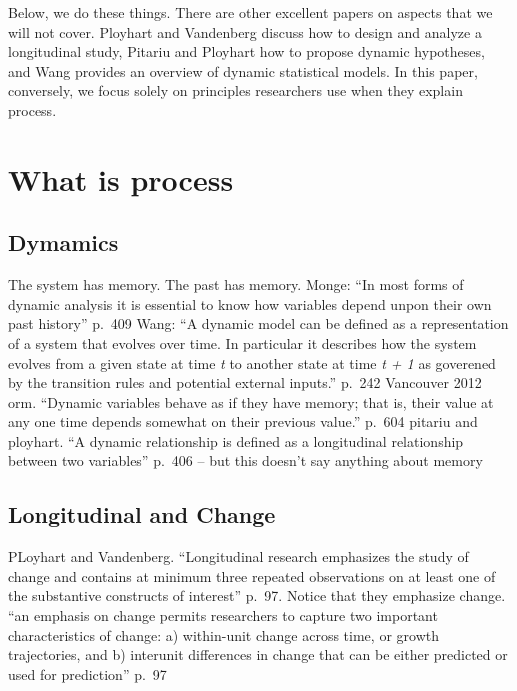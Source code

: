 \documentclass[english,,man]{apa6}
\theoremstyle{definition}
\theoremstyle{definition}
\theoremstyle{definition}
\theoremstyle{remark}
\begin{document}
Below, we do these things. There are other excellent papers on aspects
that we will not cover. Ployhart and Vandenberg discuss how to design
and analyze a longitudinal study, Pitariu and Ployhart how to propose
dynamic hypotheses, and Wang provides an overview of dynamic statistical
models. In this paper, conversely, we focus solely on principles
researchers use when they explain process.

\hypertarget{what-is-process}{%
\section{What is process}\label{what-is-process}}

\hypertarget{dymamics}{%
\subsection{Dymamics}\label{dymamics}}

The system has memory. The past has memory. Monge: \enquote{In most
forms of dynamic analysis it is essential to know how variables depend
unpon their own past history} p.~409 Wang: \enquote{A dynamic model can
be defined as a representation of a system that evolves over time. In
particular it describes how the system evolves from a given state at
time \emph{t} to another state at time \emph{t + 1} as goverened by the
transition rules and potential external inputs.} p.~242 Vancouver 2012
orm. \enquote{Dynamic variables behave as if they have memory; that is,
their value at any one time depends somewhat on their previous value.}
p.~604 pitariu and ployhart. \enquote{A dynamic relationship is defined
as a longitudinal relationship between two variables} p.~406 -- but this
doesn't say anything about memory

\hypertarget{longitudinal-and-change}{%
\subsection{Longitudinal and Change}\label{longitudinal-and-change}}

PLoyhart and Vandenberg. \enquote{Longitudinal research emphasizes the
study of change and contains at minimum three repeated observations on
at least one of the substantive constructs of interest} p.~97. Notice
that they emphasize change. \enquote{an emphasis on change permits
researchers to capture two important characteristics of change: a)
within-unit change across time, or growth trajectories, and b) interunit
differences in change that can be either predicted or used for
prediction} p.~97
\end{document}
